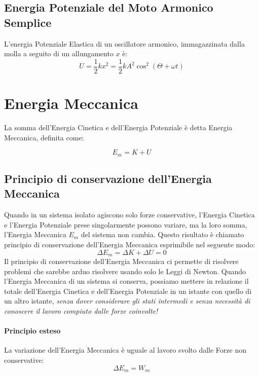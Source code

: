         \subsection{Energia Potenziale del Moto Armonico Semplice} L'energia 
        Potenziale Elastica di un oscillatore armonico, immagazzinata dalla 
        molla a seguito di un allungamento $x$ è:
        \begin{equation}
            U = \frac{1}{2}kx^2 = \frac{1}{2}kA^2\cos^2(\Theta + \omega t)
        \end{equation}

    \section{Energia Meccanica} La somma dell'Energia Cinetica e dell'Energia
    Potenziale è detta Energia Meccanica, definita come:

        \begin{equation}
            E_m = K + U
        \end{equation}

        \subsection{Principio di conservazione dell'Energia Meccanica} Quando in 
        un sistema isolato agiscono solo forze conservative, l'Energia Cinetica 
        e l'Energia Potenziale prese singolarmente possono variare, ma la loro
        somma, l'Energia Meccanica $E_m$ del sistema non cambia. Questo 
        risultato è chiamato principio di conservazione dell'Energia Meccanica
        esprimibile nel seguente modo:
        \begin{equation}
            \Delta E_m = \Delta K + \Delta U = 0
        \end{equation}
        Il principio di conservazione dell'Energia Meccanica ci permette di 
        risolvere problemi che sarebbe arduo risolvere usando solo le Leggi di 
        Newton.
        Quando l'Energia Meccanica di un sistema si conserva, possiamo mettere
        in relazione il totale dell'Energia Cinetica e dell'Energia Potenziale
        in un istante con quello di un altro istante, \textit{senza dover
        considerare gli stati intermedi e senza necessità di conoscere il 
        lavoro compiuto dalle forze coinvolte!}

        \paragraph{Principio esteso} La variazione dell'Energia Meccanica è 
        uguale al lavoro svolto dalle Forze non conservative:
        \begin{equation}
            \Delta E_m = W_{nc}
        \end{equation}
        

